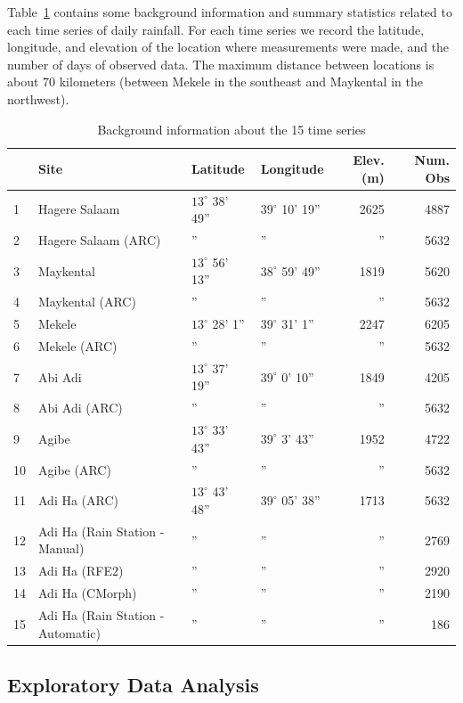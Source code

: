 \documentclass[12pt]{article}
\begin{document}
Table~\ref{tab_summary} contains some background information and summary statistics related to each time series of daily rainfall. For each time series we record the latitude, longitude, and elevation of the location where measurements were made, and the number of days of observed data. The maximum distance between locations is about 70 kilometers (between Mekele in the southeast and Maykental in the northwest).
\begin{table}[htdp]
\caption{Background information about the 15 time series}
\begin{center}
\begin{tabular}{|l|l|l|l|r|r|}
\hline
 & Site & Latitude & Longitude & Elev. (m) & Num. Obs \\
\hline
1 & Hagere Salaam & $13^\circ$ 38' 49'' & $39^\circ$ 10' 19'' & 2625 & 4887 \\
2 & Hagere Salaam (ARC) & '' & '' & '' & 5632 \\
3 & Maykental & $13^\circ$ 56' 13'' & $38^\circ$ 59' 49'' & 1819 & 5620 \\
4 & Maykental (ARC) & '' & '' & '' & 5632 \\
5 & Mekele & $13^\circ$ 28' 1'' & $39^\circ$ 31' 1'' & 2247 & 6205 \\
6 & Mekele (ARC) & '' & '' & '' & 5632 \\
7 & Abi Adi & $13^\circ$ 37' 19'' & $39^\circ$ 0' 10'' & 1849 & 4205 \\
8 & Abi Adi (ARC) & '' & '' & '' & 5632 \\
9 & Agibe & $13^\circ$ 33' 43'' & $39^\circ$ 3' 43'' & 1952 & 4722 \\
10 & Agibe (ARC) & '' & '' & '' & 5632 \\
11 & Adi Ha (ARC) & $13^\circ$ 43' 48'' & $39^\circ$ 05' 38'' & 1713 & 5632 \\
12 & Adi Ha (Rain Station - Manual) & '' & '' & '' & 2769 \\
13 & Adi Ha (RFE2) & '' & '' & '' & 2920 \\
14 & Adi Ha (CMorph) & '' & '' & '' & 2190 \\
15 & Adi Ha (Rain Station - Automatic) & '' & '' & '' & 186 \\
\hline
\end{tabular}
\end{center}
\label{tab_summary}
\end{table}%

\subsection{Exploratory Data Analysis}
\end{document}
